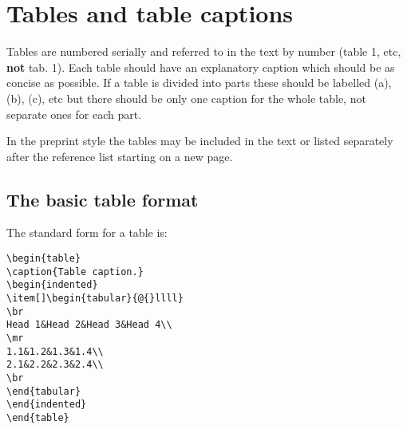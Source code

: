 \section{Tables and table captions}
Tables are numbered serially and referred to in the text
by number (table 1, etc, {\bf not} tab. 1). Each table should have an
explanatory caption which should be as concise as possible. If a table
is divided into parts these should be labelled \pt(a), \pt(b),
\pt(c), etc but there should be only one caption for the whole
table, not separate ones for each part.

In the preprint style the tables may be included in the text
or listed separately after the reference list
starting on a new page.

\subsection{The basic table format}
The standard form for a table is:
\begin{verbatim}
\begin{table}
\caption{Table caption.}
\begin{indented}
\item[]\begin{tabular}{@{}llll}
\br
Head 1&Head 2&Head 3&Head 4\\
\mr
1.1&1.2&1.3&1.4\\
2.1&2.2&2.3&2.4\\
\br
\end{tabular}
\end{indented}
\end{table}
\end{verbatim}

